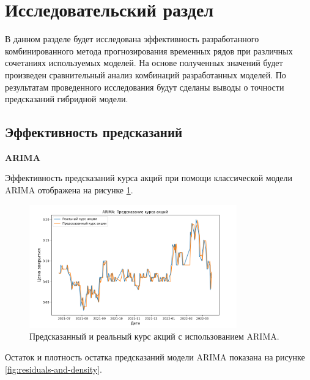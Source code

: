 \section{Исследовательский раздел}

\par В данном разделе будет исследована эффективность разработанного комбинированного метода прогнозирования временных рядов при различных сочетаниях используемых моделей. На основе полученных значений будет произведен сравнительный анализ комбинаций разработанных моделей. По результатам проведенного исследования будут сделаны выводы о точности предсказаний гибридной модели.

\subsection{Эффективность предсказаний}

\textbf{ARIMA}

\par Эффективность предсказаний курса акций при помощи классической модели ARIMA отображена на рисунке \ref{fig:research-arima}.

\begin{figure}[hbtp]
  \centering
  \includegraphics[width=0.8\textwidth]{img/arima.png}
  \caption{Предсказанный и реальный курс акций с использованием ARIMA.}
  \label{fig:research-arima}
\end{figure}

\par Остаток и плотность остатка предсказаний модели ARIMA показана на рисунке \ref{fig:residuals-and-density}.

